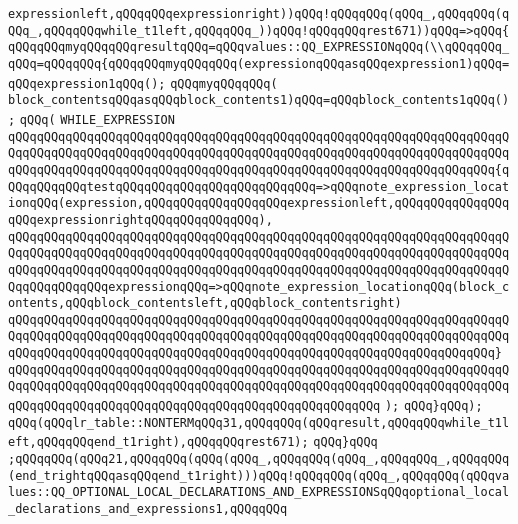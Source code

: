 \verb|expressionleft,qQQqqQQqexpressionright))qQQq!qQQqqQQq(qQQq_,qQQqqQQq(qQQq_,qQQqqQQqwhile_t1left,qQQqqQQq_))qQQq!qQQqqQQqrest671))qQQq=>qQQq{qQQqqQQqmyqQQqqQQqresultqQQq=qQQqvalues::QQ_EXPRESSIONqQQq(\\qQQqqQQq_qQQq=qQQqqQQq{qQQqqQQqmyqQQqqQQq(expressionqQQqasqQQqexpression1)qQQq=qQQqexpression1qQQq();|\newline
\verb|qQQqmyqQQqqQQq(|\newline
\verb|block_contentsqQQqasqQQqblock_contents1)qQQq=qQQqblock_contents1qQQq();|\newline
\verb|qQQq(|\newline
\verb|WHILE_EXPRESSION|\newline
\verb|qQQqqQQqqQQqqQQqqQQqqQQqqQQqqQQqqQQqqQQqqQQqqQQqqQQqqQQqqQQqqQQqqQQqqQQqqQQqqQQqqQQqqQQqqQQqqQQqqQQqqQQqqQQqqQQqqQQqqQQqqQQqqQQqqQQqqQQqqQQqqQQqqQQqqQQqqQQqqQQqqQQqqQQqqQQqqQQqqQQqqQQqqQQqqQQqqQQqqQQqqQQqqQQq{qQQqqQQqqQQqtestqQQqqQQqqQQqqQQqqQQqqQQqqQQq=>qQQqnote_expression_locationqQQq(expression,qQQqqQQqqQQqqQQqqQQqexpressionleft,qQQqqQQqqQQqqQQqqQQqexpressionrightqQQqqQQqqQQqqQQq),|\newline
\verb|qQQqqQQqqQQqqQQqqQQqqQQqqQQqqQQqqQQqqQQqqQQqqQQqqQQqqQQqqQQqqQQqqQQqqQQqqQQqqQQqqQQqqQQqqQQqqQQqqQQqqQQqqQQqqQQqqQQqqQQqqQQqqQQqqQQqqQQqqQQqqQQqqQQqqQQqqQQqqQQqqQQqqQQqqQQqqQQqqQQqqQQqqQQqqQQqqQQqqQQqqQQqqQQqqQQqqQQqqQQqqQQqexpressionqQQq=>qQQqnote_expression_locationqQQq(block_contents,qQQqblock_contentsleft,qQQqblock_contentsright)|\newline
\verb|qQQqqQQqqQQqqQQqqQQqqQQqqQQqqQQqqQQqqQQqqQQqqQQqqQQqqQQqqQQqqQQqqQQqqQQqqQQqqQQqqQQqqQQqqQQqqQQqqQQqqQQqqQQqqQQqqQQqqQQqqQQqqQQqqQQqqQQqqQQqqQQqqQQqqQQqqQQqqQQqqQQqqQQqqQQqqQQqqQQqqQQqqQQqqQQqqQQqqQQqqQQqqQQq}|\newline
\verb|qQQqqQQqqQQqqQQqqQQqqQQqqQQqqQQqqQQqqQQqqQQqqQQqqQQqqQQqqQQqqQQqqQQqqQQqqQQqqQQqqQQqqQQqqQQqqQQqqQQqqQQqqQQqqQQqqQQqqQQqqQQqqQQqqQQqqQQqqQQqqQQqqQQqqQQqqQQqqQQqqQQqqQQqqQQqqQQqqQQqqQQqqQQqqQQq|\newline
\verb|);|\newline
\verb|qQQq}qQQq);|\newline
\verb|qQQq(qQQqlr_table::NONTERMqQQq31,qQQqqQQq(qQQqresult,qQQqqQQqwhile_t1left,qQQqqQQqend_t1right),qQQqqQQqrest671);|\newline
\verb|qQQq}qQQq|\newline
\verb|;qQQqqQQq(qQQq21,qQQqqQQq(qQQq(qQQq_,qQQqqQQq(qQQq_,qQQqqQQq_,qQQqqQQq(end_trightqQQqasqQQqend_t1right)))qQQq!qQQqqQQq(qQQq_,qQQqqQQq(qQQqvalues::QQ_OPTIONAL_LOCAL_DECLARATIONS_AND_EXPRESSIONSqQQqoptional_local_declarations_and_expressions1,qQQqqQQq|\newline
